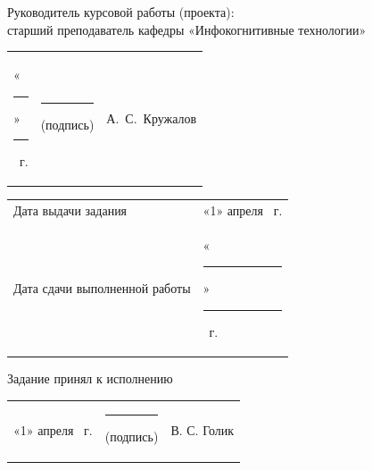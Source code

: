 \documentclass[14pt, a4paper]{extarticle}
\begin{document}

Руководитель курсовой работы (проекта): \\ старший преподаватель кафедры
«Инфокогнитивные технологии»

{
\renewcommand{\arraystretch}{2}
\noindent
\begin{tabularx}{\textwidth}{@{} P{0.45\textwidth} P{0.3\textwidth} P{0.25\textwidth} @{}}

    «\rule{0.8cm}{0.4pt}» \quad \rule{2cm}{0.4pt} ~г. &
    \centering \rule{3.5cm}{0.4pt} \par \footnotesize (подпись) &
    \hfill А.~С.~Кружалов                                         \\
\end{tabularx}

\begin{tabularx}{\textwidth}{@{} P{0.45\textwidth} P{0.55\textwidth} @{}}
    Дата выдачи задания           &
    \hfill «1» \quad апреля ~г. \\

    Дата сдачи выполненной работы &
    \hfill «\rule{0.8cm}{0.4pt}» \quad \rule{2cm}{0.4pt} ~г. \\
\end{tabularx}
}

Задание принял к исполнению

{
\renewcommand{\arraystretch}{1.5}
\begin{tabularx}{\textwidth}{@{} P{0.45\textwidth } P{0.3\textwidth} P{0.25\textwidth} @{}}

    «1» \quad апреля ~г. &
    \centering \rule{3.5cm}{0.4pt} \par \footnotesize (подпись) &
    \hfill В. С. Голик                                         \\
\end{tabularx}
}
\end{document}
